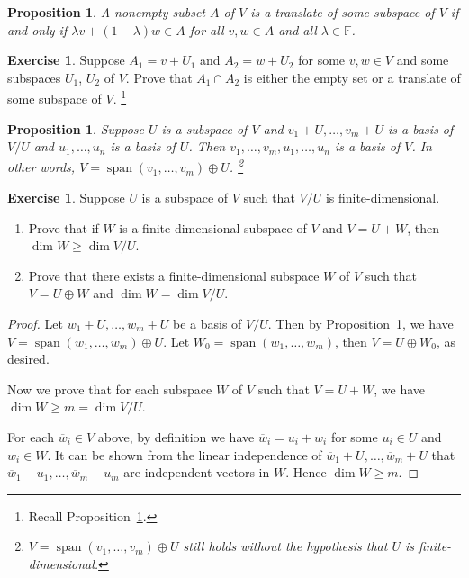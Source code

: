 \documentclass{tufte-handout}
\theoremstyle{plain} %
\newtheorem{prop}[thm]{Proposition}
\theoremstyle{definition}
\newtheorem{exer}[thm]{Exercise}
\theoremstyle{remark}
\newcommand{\bra}[1]{\mathopen{}\left(#1\right)}
\newcommand{\F}{\mathbb{F}}
\DeclareMathOperator{\spn}{span}
\begin{document}
\begin{prop}\label{prop: test for translate}
	A nonempty subset $A$ of $V$ is a translate of some subspace of $V$ if and only if $\lambda v+\bra{1-\lambda}w\in A$ for all $v,w\in A$ and all $\lambda\in\F$.
\end{prop}

\begin{exer}
	Suppose $A_1=v+U_1$ and $A_2=w+U_2$ for some $v,w\in V$ and some subspaces $U_1$, $U_2$ of $V$. Prove that $A_1\cap A_2$ is either the empty set or a translate of some subspace of $V$.%
    \footnote{Recall Proposition~\ref{prop: test for translate}.}
\end{exer}

\begin{prop}\label{prop: direct sum from quotient space}
	Suppose $U$ is a subspace of $V$ and $v_1+U,\dots,v_m+U$ is a basis of $V/U$ and $u_1,\dots,u_n$ is a basis of $U$. Then $v_1,\dots,v_m,u_1,\dots,u_n$ is a basis of $V$. In other words, $V=\spn(v_1,\dots,v_m)\oplus U$.%
    \footnote{$V=\spn(v_1,\dots,v_m)\oplus U$ still holds without the hypothesis that $U$ is finite-dimensional.}
\end{prop}

\begin{exer}
	Suppose $U$ is a subspace of $V$ such that $V/U$ is finite-dimensional.
	\begin{enumerate}
		\item Prove that if $W$ is a finite-dimensional subspace of $V$ and $V=U+W$, then $\dim W\geq\dim V/U$.
		\item Prove that there exists a finite-dimensional subspace $W$ of $V$ such that $V=U\oplus W$ and $\dim W=\dim V/U$.
	\end{enumerate}
\end{exer}
\begin{proof}
	Let $\overline{w}_1+U,\dots,\overline{w}_m+U$ be a basis of $V/U$. Then by Proposition~\ref{prop: direct sum from quotient space}, we have $V=\spn(\overline{w}_1,\dots,\overline{w}_m)\oplus U$. Let $W_0=\spn(\overline{w}_1,\dots,\overline{w}_m)$, then $V=U\oplus W_0$, as desired.

	Now we prove that for each subspace $W$ of $V$ such that $V=U+W$, we have $\dim W\geq m=\dim V/U$.
	
	For each $\overline{w}_i\in V$ above, by definition we have $\overline{w}_i=u_i+w_i$ for some $u_i\in U$ and $w_i\in W$. It can be shown from the linear independence of $\overline{w}_1+U,\dots,\overline{w}_m+U$ that $\overline{w}_1-u_1,\dots,\overline{w}_m-u_m$ are independent vectors in $W$. Hence $\dim W\geq m$.
\end{proof}
\end{document}
